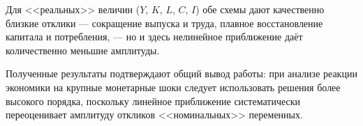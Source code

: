 Для <<реальных>> величин (\(Y\), \(K\), \(L\), \(C\), \(I\)) обе схемы дают качественно близкие отклики --- сокращение выпуска и труда, плавное восстановление капитала и потребления, --- но и здесь нелинейное приближение даёт количественно меньшие амплитуды.

Полученные результаты подтверждают общий вывод работы: при анализе реакции экономики на крупные монетарные шоки следует использовать решения более высокого порядка, поскольку линейное приближение систематически переоценивает амплитуду откликов <<номинальных>> переменных.
